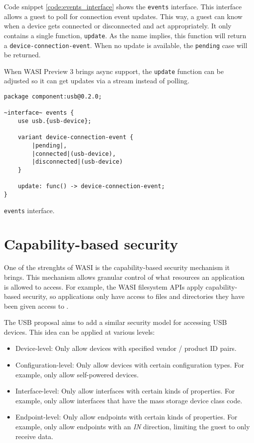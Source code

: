 Code snippet \ref{code:events_interface} shows the \texttt{events} interface. This interface allows a guest to poll for connection event updates. This way, a guest can know when a device gets connected or disconnected and act appropriately. It only contains a single function, \texttt{update}. As the name implies, this function will return a \texttt{device-connection-event}. When no update is available, the \texttt{pending} case will be returned.

When \acrshort{WASI} Preview 3 brings async support, the \texttt{update} function can be adjusted so it can get updates via a stream instead of polling.\\

\begin{code}
\begin{lstlisting}[language=wit, tabsize=4]
package component:usb@0.2.0;

~interface~ events {
	use usb.{usb-device};

	variant device-connection-event {
		|pending|,
		|connected|(usb-device),
		|disconnected|(usb-device)
	}

	update: func() -> device-connection-event;
}
\end{lstlisting}
\caption{\texttt{events} interface.}
\label{code:events_interface}
\end{code}

\newpage

\section{Capability-based security}
\label{section:capability_based_security}
One of the strenghts of \acrshort{WASI} is the capability-based security mechanism it brings. This mechanism allows granular control of what resources an application is allowed to access. For example, the \acrshort{WASI} filesystem APIs apply capability-based security, so applications only have access to files and directories they have been given access to \cite{wasi_security}.

The \acrshort{USB} proposal aims to add a similar security model for accessing USB devices. This idea can be applied at various levels:
\begin{itemize}
\item Device-level: Only allow devices with specified vendor / product ID pairs.
\item Configuration-level: Only allow devices with certain configuration types. For example, only allow self-powered devices.
\item Interface-level: Only allow interfaces with certain kinds of properties. For example, only allow interfaces that have the mass storage device class code.
\item Endpoint-level: Only allow endpoints with certain kinds of properties. For example, only allow endpoints with an \textit{IN} direction, limiting the guest to only receive data.
\end{itemize}

